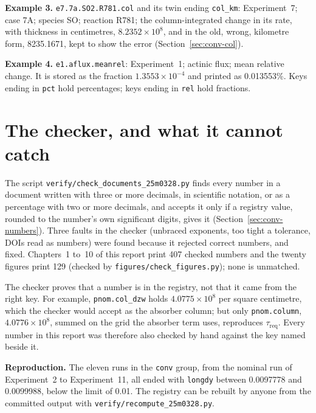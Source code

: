 \textbf{Example 3.} \texttt{e7.7a.SO2.R781.col} and its twin ending \texttt{col\_km}:
Experiment~7; case 7A; species SO; reaction R781; the column-integrated change in
its rate, with thickness in centimetres, $8.2352\times10^{8}$, and in the old, wrong,
kilometre form, 8235.1671, kept to show the error (Section~\ref{sec:conv-col}).

\textbf{Example 4.} \texttt{e1.aflux.meanrel}: Experiment~1; actinic flux; mean relative
change. It is stored as the fraction $1.3553\times10^{-4}$ and printed as 0.013553\%. Keys
ending in \texttt{pct} hold percentages; keys ending in \texttt{rel} hold fractions.

\section{The checker, and what it cannot catch}
\label{sec:checker}

The script \texttt{verify/check\_documents\_25m0328.py} finds every number in a document
written with three or more decimals, in scientific notation, or as a percentage with two
or more decimals, and accepts it only if a registry value, rounded to the number's own
significant digits, gives it (Section~\ref{sec:conv-numbers}). Three faults in the
checker (unbraced exponents, too tight a tolerance, DOIs read as numbers) were found
because it rejected correct numbers, and fixed. Chapters~1 to~10 of this report print
407 checked numbers and the twenty figures print 129 (checked by
\texttt{figures/check\_figures.py}); none is unmatched.

The checker proves that a number is in the registry, not that it came from the right
key. For example, \texttt{pnom.col\_dzw} holds $4.0775\times10^{8}$ per square
centimetre, which the checker would accept as the absorber column; but only
\texttt{pnom.column}, $4.0776\times10^{8}$, summed on the grid the absorber term uses,
reproduces $\tau_{\mathrm{req}}$. Every number in this report was therefore also
checked by hand against the key named beside it.

\textbf{Reproduction.} The eleven runs in the \texttt{conv} group, from the nominal run of
Experiment~2 to Experiment~11, all ended with \texttt{longdy} between 0.0097778 and
0.0099988, below the limit of 0.01. The registry can be rebuilt by anyone from the
committed output with \texttt{verify/recompute\_25m0328.py}.

